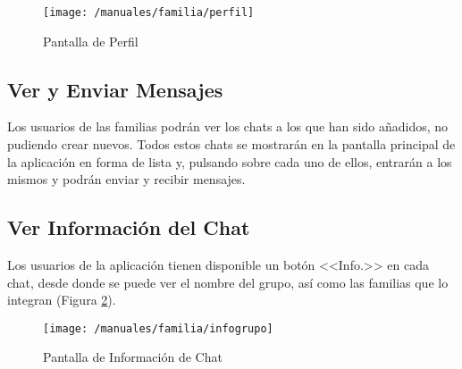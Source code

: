 \begin{figure}[!h]
	\begin{center}
		\texttt{[image: /manuales/familia/perfil]}
		\caption{Pantalla de Perfil}
		\label{fig:perfilfamilia}
	\end{center}
\end{figure}

\clearpage

\subsection*{Ver y Enviar Mensajes}
Los usuarios de las familias podrán ver los chats a los que han sido añadidos, no pudiendo crear nuevos. Todos estos chats se mostrarán en la pantalla principal de la aplicación en forma de lista y, pulsando sobre cada uno de ellos, entrarán a los mismos y podrán enviar y recibir mensajes.

\subsection*{Ver Información del Chat}
Los usuarios de la aplicación tienen disponible un botón <<Info.>> en cada chat, desde donde se puede ver el nombre del grupo, así como las familias que lo integran (Figura \ref{fig:infochatfamilia}).

\begin{figure}[!h]
	\begin{center}
		\texttt{[image: /manuales/familia/infogrupo]}
		\caption{Pantalla de Información de Chat}
		\label{fig:infochatfamilia}
	\end{center}
\end{figure}




